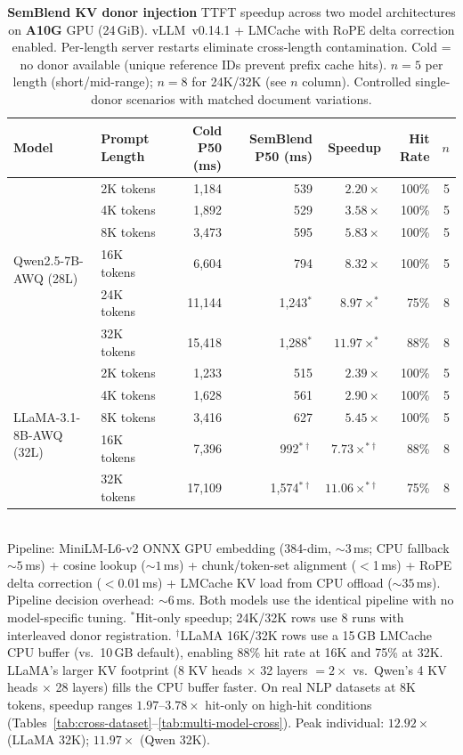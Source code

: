 \documentclass[10pt,twocolumn]{article}
\begin{document}
\begin{table}[t]
\centering
\caption{\textbf{SemBlend KV donor injection} TTFT speedup across two
model architectures on \textbf{A10G} GPU (24\,GiB).
vLLM~v0.14.1 + LMCache with RoPE delta correction enabled.
Per-length server restarts eliminate cross-length contamination.
Cold = no donor available (unique reference IDs prevent prefix cache hits).
$n{=}5$ per length (short/mid-range); $n{=}8$ for 24K/32K (see $n$ column). Controlled single-donor scenarios with
matched document variations.}
\label{tab:results-kv}
\scriptsize
\setlength{\tabcolsep}{4pt}
\begin{tabular}{@{}llrrrrr@{}}
\toprule
\textbf{Model} & \textbf{Prompt Length} & \textbf{Cold P50 (ms)} & \textbf{SemBlend P50 (ms)} & \textbf{Speedup} & \textbf{Hit Rate} & \textbf{$n$} \\
\midrule
\multirow{6}{*}{Qwen2.5-7B-AWQ (28L)}
& 2K tokens  & 1,184 &  539 & $2.20\times$           & 100\% & 5 \\
& 4K tokens  & 1,892 &  529 & $3.58\times$           & 100\% & 5 \\
& 8K tokens  & 3,473 &  595 & $5.83\times$           & 100\% & 5 \\
& 16K tokens & 6,604 &  794 & $8.32\times$           & 100\% & 5 \\
& 24K tokens & 11,144 & 1,243$^*$ & $8.97\times^*$  &  75\% & 8 \\
& 32K tokens & 15,418 & 1,288$^*$ & $\mathbf{11.97\times^*}$ & 88\% & 8 \\
\midrule
\multirow{5}{*}{LLaMA-3.1-8B-AWQ (32L)}
& 2K tokens  & 1,233 &  515 & $2.39\times$          & 100\% & 5 \\
& 4K tokens  & 1,628 &  561 & $2.90\times$          & 100\% & 5 \\
& 8K tokens  & 3,416 &  627 & $5.45\times$          & 100\% & 5 \\
& 16K tokens & 7,396 &  992$^{*\dagger}$ & $7.73\times^{*\dagger}$ & 88\% & 8 \\
& 32K tokens & 17,109 & 1,574$^{*\dagger}$ & $\mathbf{11.06\times^{*\dagger}}$ & 75\% & 8 \\
\bottomrule
\end{tabular}\\[2pt]
{\footnotesize Pipeline: MiniLM-L6-v2 ONNX GPU embedding (384-dim, ${\sim}3$\,ms;
CPU fallback ${\sim}5$\,ms) + cosine lookup (${\sim}1$\,ms) +
chunk/token-set alignment ($<$1\,ms) + RoPE delta
correction ($<$0.01\,ms) + LMCache KV load from CPU offload (${\sim}35$\,ms).
Pipeline decision overhead: ${\sim}6$\,ms. Both models use the identical
pipeline with no model-specific tuning.
$^*$Hit-only speedup; 24K/32K rows use 8 runs with interleaved donor registration.
$^\dagger$LLaMA 16K/32K rows use a 15\,GB LMCache CPU buffer
(vs.\ 10\,GB default), enabling 88\% hit rate at 16K and 75\% at 32K.
LLaMA's larger KV footprint (8 KV heads $\times$ 32 layers $= 2\times$ vs.\ Qwen's
4 KV heads $\times$ 28 layers) fills the CPU buffer faster. On real NLP datasets
at 8K tokens, speedup ranges $1.97$--$3.78\times$ hit-only on high-hit conditions
(Tables~\ref{tab:cross-dataset}--\ref{tab:multi-model-cross}).
Peak individual: $12.92\times$ (LLaMA 32K); $11.97\times$ (Qwen 32K).}
\end{table}
\end{document}
